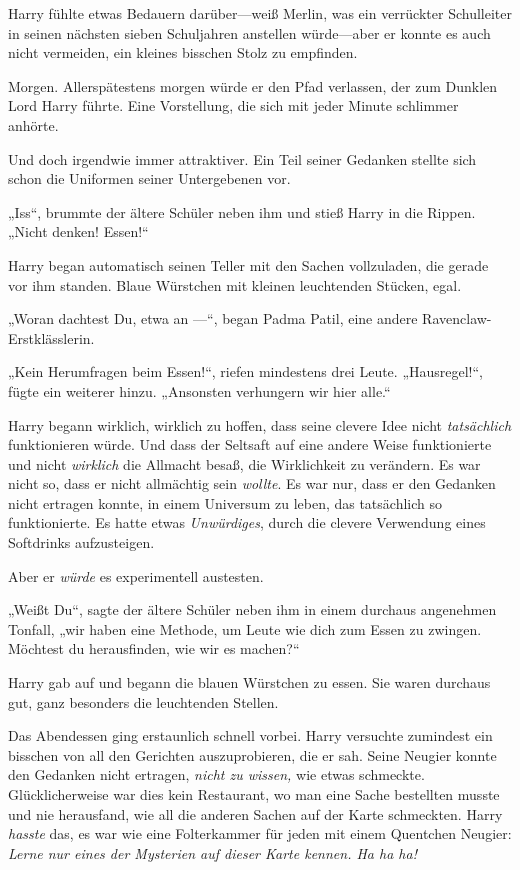 {Harry fühlte etwas Bedauern darüber—weiß Merlin, was ein verrückter Schulleiter in seinen nächsten sieben Schuljahren anstellen würde—aber er konnte es auch nicht vermeiden, ein kleines bisschen Stolz zu empfinden.

Morgen. Allerspätestens morgen würde er den Pfad verlassen, der zum Dunklen Lord Harry führte. Eine Vorstellung, die sich mit jeder Minute schlimmer anhörte.

Und doch irgendwie immer attraktiver. Ein Teil seiner Gedanken stellte sich schon die Uniformen seiner Untergebenen vor.

„Iss“, brummte der ältere Schüler neben ihm und stieß Harry in die Rippen. „Nicht denken! Essen!“

Harry began automatisch seinen Teller mit den Sachen vollzuladen, die gerade vor ihm standen. Blaue Würstchen mit kleinen leuchtenden Stücken, egal.

„Woran dachtest Du, etwa an —“, began Padma Patil, eine andere Ravenclaw-Erstklässlerin.

„Kein Herumfragen beim Essen!“, riefen mindestens drei Leute. „Hausregel!“, fügte ein weiterer hinzu. „Ansonsten verhungern wir hier alle.“

Harry begann wirklich, wirklich zu hoffen, dass seine clevere Idee nicht \emph{tatsächlich} funktionieren würde. Und dass der Seltsaft auf eine andere Weise funktionierte und nicht \emph{wirklich} die Allmacht besaß, die Wirklichkeit zu verändern. Es war nicht so, dass er nicht allmächtig sein \emph{wollte}. Es war nur, dass er den Gedanken nicht ertragen konnte, in einem Universum zu leben, das tatsächlich so funktionierte. Es hatte etwas \emph{Unwürdiges}, durch die clevere Verwendung eines Softdrinks aufzusteigen.

Aber er \emph{würde} es experimentell austesten.

„Weißt Du“, sagte der ältere Schüler neben ihm in einem durchaus angenehmen Tonfall, „wir haben eine Methode, um Leute wie dich zum Essen zu zwingen. Möchtest du herausfinden, wie wir es machen?“

Harry gab auf und begann die blauen Würstchen zu essen. Sie waren durchaus gut, ganz besonders die leuchtenden Stellen.

Das Abendessen ging erstaunlich schnell vorbei. Harry versuchte zumindest ein bisschen von all den Gerichten auszuprobieren, die er sah. Seine Neugier konnte den Gedanken nicht ertragen, \emph{nicht zu wissen,} wie etwas schmeckte. Glücklicherweise war dies kein Restaurant, wo man eine Sache bestellten musste und nie herausfand, wie all die anderen Sachen auf der Karte schmeckten. Harry \emph{hasste} das, es war wie eine Folterkammer für jeden mit einem Quentchen Neugier: \emph{Lerne nur eines der Mysterien auf dieser Karte kennen. Ha ha ha!}

}

